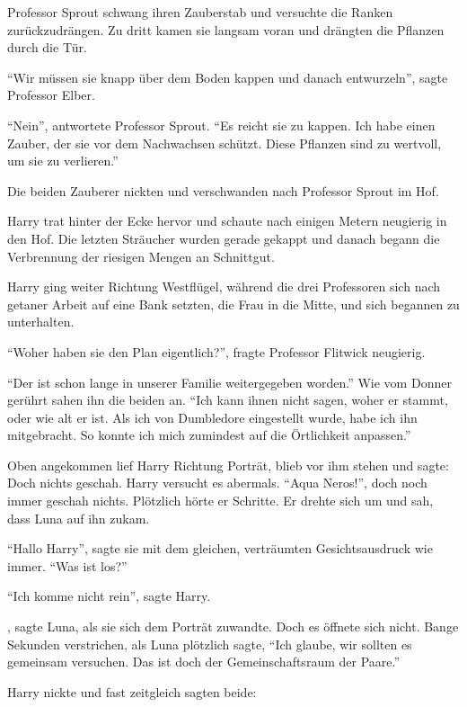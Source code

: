 Professor Sprout schwang ihren Zauberstab und versuchte die Ranken zurückzudrängen. Zu dritt kamen sie langsam voran und drängten die Pflanzen durch die Tür.

\enquote{Wir müssen sie knapp über dem Boden kappen und danach entwurzeln}, sagte Professor Elber.

\enquote{Nein}, antwortete Professor Sprout. \enquote{Es reicht sie zu kappen. Ich habe einen Zauber, der sie vor dem Nachwachsen schützt. Diese Pflanzen sind zu wertvoll, um sie zu verlieren.}

Die beiden Zauberer nickten und verschwanden nach Professor Sprout im Hof.

Harry trat hinter der Ecke hervor und schaute nach einigen Metern neugierig in den Hof. Die letzten Sträucher wurden gerade gekappt und danach begann die Verbrennung der riesigen Mengen an Schnittgut.

Harry ging weiter Richtung Westflügel, während die drei Professoren sich nach getaner Arbeit auf eine Bank setzten, die Frau in die Mitte, und sich begannen zu unterhalten.

\enquote{Woher haben sie den Plan eigentlich?}, fragte Professor Flitwick neugierig.

\enquote{Der ist schon lange in unserer Familie weitergegeben worden.} Wie vom Donner gerührt sahen ihn die beiden an. \enquote{Ich kann ihnen nicht sagen, woher er stammt, oder wie alt er ist. Als ich von Dumbledore eingestellt wurde, habe ich ihn mitgebracht. So konnte ich mich zumindest auf die Örtlichkeit anpassen.}

Oben angekommen lief Harry Richtung Porträt, blieb vor ihm stehen und sagte:  Doch nichts geschah. Harry versucht es abermals. \enquote{Aqua Neros!}, doch noch immer geschah nichts. Plötzlich hörte er Schritte. Er drehte sich um und sah, dass Luna auf ihn zukam.

\enquote{Hallo Harry}, sagte sie mit dem gleichen, verträumten Gesichtsausdruck wie immer. \enquote{Was ist los?}

\enquote{Ich komme nicht rein}, sagte Harry.

, sagte Luna, als sie sich dem Porträt zuwandte. Doch es öffnete sich nicht. Bange Sekunden verstrichen, als Luna plötzlich sagte, \enquote{Ich glaube, wir sollten es gemeinsam versuchen. Das ist doch der Gemeinschaftsraum der Paare.}

Harry nickte und fast zeitgleich sagten beide: 

